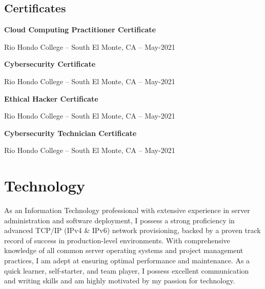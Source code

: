 \documentclass[a4paper]{article}
\begin{document}
\vspace{20pt}
\subsection{Certificates}
\begin{minipage}{\textwidth}
\textbf{Cloud Computing Practitioner Certificate}\par
Rio Hondo College -- South El Monte, CA -- May-2021

\medskip
\textbf{Cybersecurity Certificate}\par
Rio Hondo College -- South El Monte, CA -- May-2021

\medskip
\textbf{Ethical Hacker Certificate}\par
Rio Hondo College -- South El Monte, CA -- May-2021

\medskip
\textbf{Cybersecurity Technician Certificate}\par
Rio Hondo College -- South El Monte, CA -- May-2021
\end{minipage}

\section{Technology}
\begin{minipage}{\textwidth}
As an Information Technology professional with extensive experience in server administration and software deployment, I possess a strong proficiency in advanced TCP/IP (IPv4 \& IPv6) network provisioning, backed by a proven track record of success in production-level environments. With comprehensive knowledge of all common server operating systems and project management practices, I am adept at ensuring optimal performance and maintenance. As a quick learner, self-starter, and team player, I possess excellent communication and writing skills and am highly motivated by my passion for technology.
\end{minipage}
\end{document}
